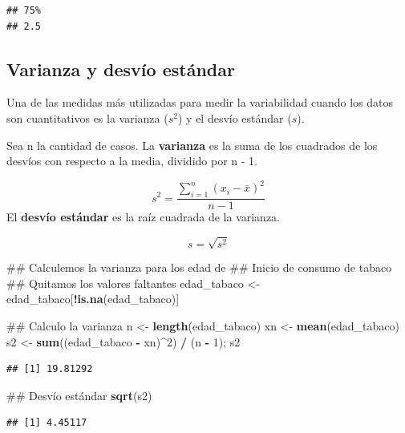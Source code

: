 \documentclass[spanish,]{book}
\newenvironment{Shaded}{\begin{snugshade}}{\end{snugshade}}
\newcommand{\KeywordTok}[1]{\textcolor[rgb]{0.13,0.29,0.53}{\textbf{#1}}}
\newcommand{\DecValTok}[1]{\textcolor[rgb]{0.00,0.00,0.81}{#1}}
\newcommand{\StringTok}[1]{\textcolor[rgb]{0.31,0.60,0.02}{#1}}
\newcommand{\OperatorTok}[1]{\textcolor[rgb]{0.81,0.36,0.00}{\textbf{#1}}}
\newcommand{\NormalTok}[1]{#1}
\begin{document}
\begin{verbatim}
## 75% 
## 2.5
\end{verbatim}

\subsection{Varianza y desvío
estándar}\label{varianza-y-desvio-estandar}

Una de las medidas más utilizadas para medir la variabilidad cuando los
datos son cuantitativos es la varianza (\(s^2\)) y el desvío estándar
(\(s\)).

Sea n la cantidad de casos. La \textbf{varianza} es la suma de los
cuadrados de los desvíos con respecto a la media, dividido por n - 1.

\[
s^2 = \frac{\sum_{i=1}^n (x_i - \bar{x})^2}{n - 1}
\] El \textbf{desvío estándar} es la raíz cuadrada de la varianza.

\[
s = \sqrt{s^2}
\]

\begin{Shaded}
\begin{Highlighting}[]
\NormalTok{## Calculemos la varianza para los edad de}
\NormalTok{## Inicio de consumo de tabaco}
\NormalTok{## Quitamos los valores faltantes}
\NormalTok{edad_tabaco <-}\StringTok{ }\NormalTok{edad_tabaco[}\OperatorTok{!}\KeywordTok{is.na}\NormalTok{(edad_tabaco)]}

\NormalTok{## Calculo la varianza}
\NormalTok{n <-}\StringTok{ }\KeywordTok{length}\NormalTok{(edad_tabaco)}
\NormalTok{xn <-}\StringTok{ }\KeywordTok{mean}\NormalTok{(edad_tabaco)}
\NormalTok{s2 <-}\StringTok{ }\KeywordTok{sum}\NormalTok{((edad_tabaco }\OperatorTok{-}\StringTok{ }\NormalTok{xn)}\OperatorTok{^}\DecValTok{2}\NormalTok{) }\OperatorTok{/}\StringTok{ }\NormalTok{(n }\OperatorTok{-}\StringTok{ }\DecValTok{1}\NormalTok{); s2}
\end{Highlighting}
\end{Shaded}

\begin{verbatim}
## [1] 19.81292
\end{verbatim}

\begin{Shaded}
\begin{Highlighting}[]
\NormalTok{## Desvío estándar}
\KeywordTok{sqrt}\NormalTok{(s2)}
\end{Highlighting}
\end{Shaded}

\begin{verbatim}
## [1] 4.45117
\end{verbatim}
\end{document}
